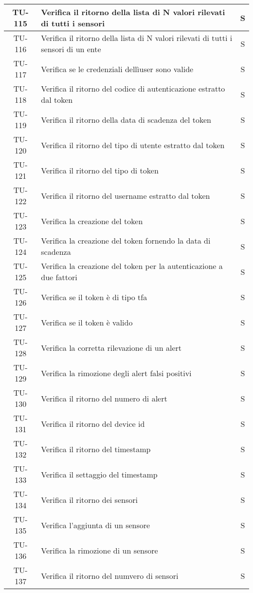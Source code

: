 \begin{center}
\begin{longtable}{|c|p{12cm}|c|}
			\hline
			TU-115 & Verifica il ritorno della lista di N valori rilevati di tutti i sensori & S \\
			\hline
			TU-116 & Verifica il ritorno della lista di N valori rilevati di tutti i sensori di un ente & S \\
			\hline
			TU-117 & Verifica se le credenziali dellìuser sono valide & S \\
			\hline
			TU-118 & Verifica il ritorno del codice di autenticazione estratto dal token & S \\
			\hline
			TU-119 & Verifica il ritorno della data di scadenza del token & S \\
			\hline
			TU-120 & Verifica il ritorno del tipo di utente estratto dal token & S \\
			\hline
			TU-121 & Verifica il ritorno del tipo di token & S \\
			\hline
			TU-122 & Verifica il ritorno del username estratto dal token & S \\
			\hline
			TU-123 & Verifica la creazione del token & S \\
			\hline
			TU-124 & Verifica la creazione del token fornendo la data di scadenza & S \\
			\hline
			TU-125 & Verifica la creazione del token per la autenticazione a due fattori & S \\
			\hline
			TU-126 & Verifica se il token è di tipo tfa & S \\
			\hline
			TU-127 & Verifica se il token è valido & S \\
			\hline
			TU-128 & Verifica la corretta rilevazione di un alert & S \\
			\hline
			TU-129 & Verifica la rimozione degli alert falsi positivi & S \\
			\hline
			TU-130 & Verifica il ritorno del numero di alert & S \\
			\hline
			TU-131 & Verifica il ritorno del device id & S \\
			\hline
			TU-132 & Verifica il ritorno del timestamp & S \\
			\hline
			TU-133 & Verifica il settaggio del timestamp & S \\
			\hline
			TU-134 & Verifica il ritorno dei sensori & S \\
			\hline
			TU-135 & Verifica l'aggiunta di un sensore & S \\
			\hline
			TU-136 & Verifica la rimozione di un sensore & S \\
			\hline
			TU-137 & Verifica il ritorno del numvero di sensori & S \\

\end{longtable}
\end{center}
